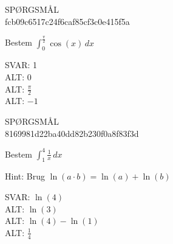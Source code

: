 \documentclass[]{article}
\newcounter{spgcounter}
\newenvironment{question}[2]{\addtocounter{spgcounter}{1} SPØRGSMÅL \thespgcounter\\}{\hspace{50px}}
\newcommand{\answer}[1]{{\color{green} SVAR: #1}\\}
\newcommand{\alt}[1]{{\color{red} ALT: #1}\\}
\begin{document}
\begin{question}{multi}\id{fcb09c6517c24f6caf85cf3c0e415f5a}

Bestem $\int_0^{\frac{\pi}{2}} \cos(x) \, dx$

\answer{1}
\alt{0}
\alt{$\frac{\pi}{2}$}
\alt{$-1$}

\end{question}

\begin{question}{multi}\id{8169981d22ba40dd82b230f0a8f83f3d}

Bestem $\int_1^4 \frac{1}{x} \, dx$

Hint: Brug $\ln(a\cdot b) = \ln(a)+\ln(b)$

\answer{$\ln(4)$}
\alt{$\ln(3)$}
\alt{$\ln(4) - \ln(1)$}
\alt{$\frac{1}{4}$}

\end{question}
\end{document}
